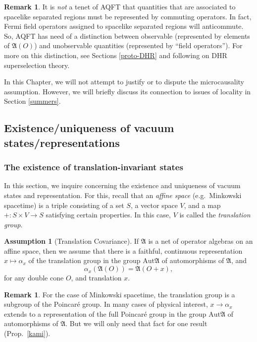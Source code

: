 \documentclass[11pt]{article}
\newcommand{\alg}[1]{\mathfrak{#1}}
\theoremstyle{definition}
\newtheorem{assumption}{Assumption}
\theoremstyle{definition}
\newtheorem{note}[thm]{Remark}
\theoremstyle{remark}
\def\al#1{{\mathfrak #1}}
\def\a{\alpha} \def\b{\beta} \def\g{\gamma} \def\d{\delta}
\newcommand{\Aut}{\mathrm{Aut}}
\begin{document}
\begin{note} It is \emph{not} a tenet of AQFT that quantities that are associated to
  spacelike separated regions must be represented by commuting operators.  In fact,
  Fermi field operators assigned to spacelike separated regions will anticommute.
  So, AQFT has need of a distinction between observable (represented by elements of
  $\alg{A}(O)$) and unobservable quantities (represented by ``field operators'').
  For more on this distinction, see Sections \ref{proto-DHR} and following on DHR
  superselection theory.
\end{note}


In this Chapter, we will not attempt to justify or to dispute the microcausality
assumption.  However, we will briefly discuss its connection to issues of locality in
Section \ref{summers}.

\subsection{Existence/uniqueness of vacuum states/representations}

\label{uniq}


\subsubsection{The existence of translation-invariant states}

In this section, we inquire concerning the existence and uniqueness of
vacuum states and representation.  For this, recall that an
\emph{affine space} (e.g.\ Minkowski spacetime) is a triple consisting
of a set $S$, a vector space $V$, and a map $+:S\times V\to S$
satisfying certain properties.  In this case, $V$ is called the
\emph{translation group}.

\begin{assumption}[Translation Covariance] If $\alg{A}$ is a net of
  operator algebras on an affine space, then we assume that there is a
  faithful, continuous representation $x\mapsto \a _x$ of the
  translation group in the group $\Aut \alg{A}$ of automorphisms of
  $\alg{A}$, and $$ \a _x(\alg{A}(O))=\alg{A}(O+x) ,$$ for any double
  cone $O$, and translation $x$.
\end{assumption}

\begin{note} For the case of Minkowski spacetime, the translation
  group is a subgroup of the Poincar{\'e} group.  In many cases of
  physical interest, $x\to \a _x$ extends to a representation of the
  full Poincar{\'e} group in the group $\Aut \al A$ of automorphisms
  of $\al A$.  But we will only need that fact for one result (Prop.\
  \ref{kami}).
\end{note}
\end{document}
